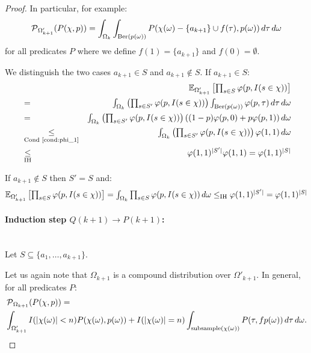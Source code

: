\begin{proof}
In particular, for example:
\[
\operatorname{\mathcal P}_{\Omega'_{k+1}}( P(\chi, p) ) = \int_{\Omega_k} \int_{\textrm{Ber}(p(\omega))}
P(\chi(\omega)-\{a_{k+1}\}\cup f(\tau), p(\omega)) \, d \tau \, d \omega
\]
for all predicates $P$ where we define $f(1) = \{a_{k+1}\}$ and $f(0) = \emptyset$.

We distinguish the two cases $a_{k+1} \in S$ and $a_{k+1} \notin S$. If $a_{k+1} \in S$:
\begin{eqnarray*}
  & & \textstyle \operatorname{\mathbb E}_{\Omega'_{k+1}}\left[\prod_{s \in S} \varphi(p, I(s \in \chi)) \right] \\
 & = & \textstyle \int_{\Omega_k} \left(\prod_{s \in S'} \varphi(p, I(s \in \chi))\right)
  \int_{\mathrm{Ber}(p(\omega))} \varphi(p, \tau) \, d \tau \, d \omega \\
  & = & \textstyle \int_{\Omega_k} \left(\prod_{s \in S'} \varphi(p, I(s \in \chi))\right) ((1-p) \varphi(p,0) +
  p \varphi(p,1)) \, d \omega\\
  & \underset{\textrm{Cond~\ref{cond:phi_1}}}{\leq} & \textstyle \int_{\Omega_k} \left( \prod_{s \in S'}
  \varphi(p, I(s \in \chi)) \right) \varphi(1,1) \, d \omega \\
  & \underset{\textrm{IH}}{\leq} & \textstyle \varphi(1,1)^{|S'|} \varphi(1,1) = \varphi(1,1)^{|S|}
\end{eqnarray*}

If $a_{k+1} \notin S$ then $S' = S$ and:
\[
  \textstyle \operatorname{\mathbb E}_{\Omega'_{k+1}}\left[\prod_{s \in S} \varphi(p, I(s \in \chi)) \right] =
  \int_{\Omega_k} \prod_{s \in S} \varphi(p, I(s \in \chi)) \, d \omega \leq_{\textrm{IH}} \varphi(1,1)^{|S'|} =
  \varphi(1,1)^{|S|}
\]
\paragraph{Induction step $Q(k+1) \rightarrow P(k+1)$:} \phantom{.}\\
Let $S \subseteq \{ a_1, \ldots, a_{k+1} \}$.

Let us again note that $\Omega_{k+1}$ is a compound distribution over $\Omega'_{k+1}$. In general, for
all predicates $P$:
\begin{align*}
  & \operatorname{\mathcal P}_{\Omega_{k+1}}( P(\chi, p) ) = \\
  & \int_{\Omega'_{k+1}} I( |\chi(\omega)|<n ) P(\chi(\omega),p(\omega)) +
  I( |\chi(\omega)|=n ) \int_{\mathrm{subsample}(\chi(\omega))}
  P(\tau, f p(\omega)) \, d \tau \, d \omega \textrm{.}
\end{align*}


\end{proof}
